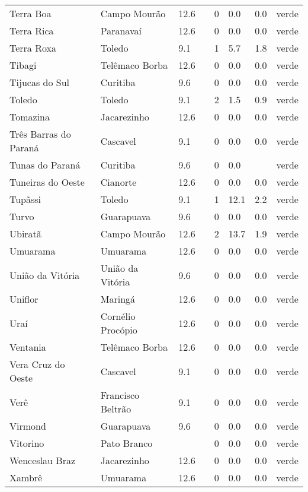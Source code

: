 \begin{longtable}{l|lllllll}
  Terra Boa & Campo Mourão & 12.6 &  & 0 & 0.0 & 0.0 & verde \\ 
  Terra Rica & Paranavaí & 12.6 &  & 0 & 0.0 & 0.0 & verde \\ 
  Terra Roxa & Toledo & 9.1 &  & 1 & 5.7 & 1.8 & verde \\ 
  Tibagi & Telêmaco Borba & 12.6 &  & 0 & 0.0 & 0.0 & verde \\ 
  Tijucas do Sul & Curitiba & 9.6 &  & 0 & 0.0 & 0.0 & verde \\ 
  Toledo & Toledo & 9.1 &  & 2 & 1.5 & 0.9 & verde \\ 
  Tomazina & Jacarezinho & 12.6 &  & 0 & 0.0 & 0.0 & verde \\ 
  Três Barras do Paraná & Cascavel & 9.1 &  & 0 & 0.0 & 0.0 & verde \\ 
  Tunas do Paraná & Curitiba & 9.6 &  & 0 & 0.0 &  & verde \\ 
  Tuneiras do Oeste & Cianorte & 12.6 &  & 0 & 0.0 & 0.0 & verde \\ 
  Tupãssi & Toledo & 9.1 &  & 1 & 12.1 & 2.2 & verde \\ 
  Turvo & Guarapuava & 9.6 &  & 0 & 0.0 & 0.0 & verde \\ 
  Ubiratã & Campo Mourão & 12.6 &  & 2 & 13.7 & 1.9 & verde \\ 
  Umuarama & Umuarama & 12.6 &  & 0 & 0.0 & 0.0 & verde \\ 
  União da Vitória & União da Vitória & 9.6 &  & 0 & 0.0 & 0.0 & verde \\ 
  Uniflor & Maringá & 12.6 &  & 0 & 0.0 & 0.0 & verde \\ 
  Uraí & Cornélio Procópio & 12.6 &  & 0 & 0.0 & 0.0 & verde \\ 
  Ventania & Telêmaco Borba & 12.6 &  & 0 & 0.0 & 0.0 & verde \\ 
  Vera Cruz do Oeste & Cascavel & 9.1 &  & 0 & 0.0 & 0.0 & verde \\ 
  Verê & Francisco Beltrão & 9.1 &  & 0 & 0.0 & 0.0 & verde \\ 
  Virmond & Guarapuava & 9.6 &  & 0 & 0.0 & 0.0 & verde \\ 
  Vitorino & Pato Branco &  &  & 0 & 0.0 & 0.0 & verde \\ 
  Wenceslau Braz & Jacarezinho & 12.6 &  & 0 & 0.0 & 0.0 & verde \\ 
  Xambrê & Umuarama & 12.6 &  & 0 & 0.0 & 0.0 & verde \\ 
  \hline
\end{longtable}
